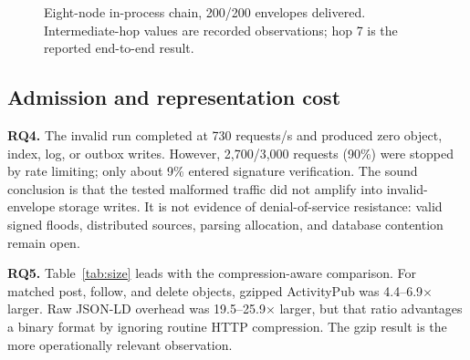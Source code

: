 \documentclass[sigconf,anonymous]{acmart}
\begin{document}
\begin{figure}[t]
\centering
{}
\caption{Eight-node in-process chain, 200/200 envelopes delivered. Intermediate-hop values are
recorded observations; hop 7 is the reported end-to-end result.}
\label{fig:chain}
\end{figure}

\subsection{Admission and representation cost}

\textbf{RQ4.} The invalid run completed at 730 requests/s and produced zero object, index, log, or
outbox writes. However, 2,700/3,000 requests (90\%) were stopped by rate limiting; only about 9\%
entered signature verification. The sound conclusion is that the tested malformed traffic did not
amplify into invalid-envelope storage writes. It is not evidence of denial-of-service resistance:
valid signed floods, distributed sources, parsing allocation, and database contention remain open.

\textbf{RQ5.} Table~\ref{tab:size} leads with the compression-aware comparison. For matched post,
follow, and delete objects, gzipped ActivityPub was 4.4--6.9$\times$ larger. Raw JSON-LD overhead was
19.5--25.9$\times$ larger, but that ratio advantages a binary format by ignoring routine HTTP
compression. The gzip result is the more operationally relevant observation.
\end{document}
